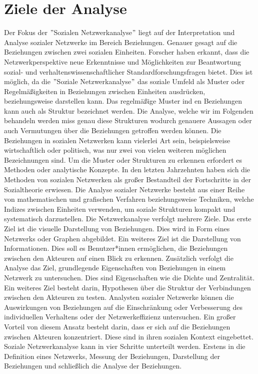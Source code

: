 \section{Ziele der Analyse}
Der Fokus der $"$Sozialen Netzwerkanalyse$"$ liegt auf der Interpretation und Analyse sozialer Netzwerke im Bereich Beziehungen. Genauer gesagt auf die Beziehungen zwischen zwei sozialen Einheiten. Forscher haben erkannt, dass die Netzwerkperspektive neue Erkenntnisse und Möglichkeiten zur Beantwortung sozial- und verhaltenswissenschaftlicher Standardforschungsfragen bietet. Dies ist möglich, da die $"$Soziale Netzwerkanalyse$"$ das soziale Umfeld als Muster oder Regelmäßigkeiten in Beziehungen zwischen Einheiten ausdrücken, beziehungsweise darstellen kann. Das regelmäßige Muster ind en Beziehungen kann auch als Struktur bezeichnet werden. Die Analyse, welche wir im Folgenden behandeln werden miss genau diese Strukturen wodurch genauere Aussagen oder auch Vermutungen über die Beziehungen getroffen werden können. Die Beziehungen in sozialen Netzwerken kann vielerlei Art sein, beispielsweise wirtschaftlich oder politisch, was nur zwei von vielen weiteren möglichen Bezeichnungen sind. Um die Muster oder Strukturen zu erkennen erfordert es Methoden oder analytische Konzepte. In den letzten Jahrzehnten haben sich die Methoden von sozialen Netzwerken als großer Bestandteil der Fortschritte in der Sozialtheorie erwiesen.
Die Analyse sozialer Netzwerke besteht aus einer Reihe von mathematischen und grafischen Verfahren beziehungsweise Techniken, welche Indizes zwischen Einheiten verwenden, um soziale Strukturen kompakt und systematisch darzustellen.
Die Netzwerkanalyse verfolgt mehrere Ziele. Das erste Ziel ist die visuelle Darstellung von Beziehungen. Dies wird in Form eines Netzwerks oder Graphen abgebildet. Ein weiteres Ziel ist die Darstellung von Informationen. Dies soll es Benutzer*innen ermöglichen, die Beziehungen zwischen den Akteuren auf einen Blick zu erkennen. Zusätzlich verfolgt die Analyse das Ziel, grundlegende Eigenschaften von Beziehungen in einem Netzwerk zu untersuchen. Dies sind Eigenschaften wie die Dichte und Zentralität. Ein weiteres Ziel besteht darin, Hypothesen über die Struktur der Verbindungen zwischen den Akteuren zu testen. Analysten sozialer Netzwerke können die Auswirkungen von Beziehungen auf die Einschränkung oder Verbesserung des individuellen Verhaltens oder der Netzwerkeffizienz untersuchen. Ein großer Vorteil von diesem Ansatz besteht darin, dass er sich auf die Beziehungen zwischen Akteuren konzentriert. Diese sind in ihren sozialen Kontext eingebettet.\\
Soziale Netzwerkanalyse kann in vier Schritte unterteilt werden. Erstens in die Definition eines Netzwerks, Messung der Beziehungen, Darstellung der Beziehungen und schließlich die Analyse der Beziehungen. 

